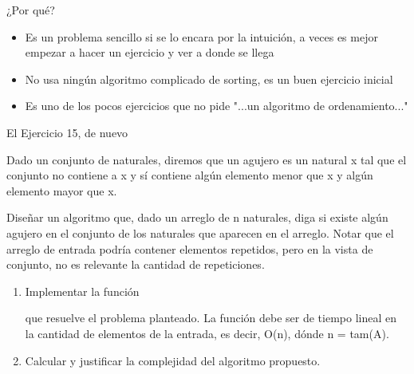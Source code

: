 \documentclass[pdf
]{beamer}
\begin{document}
\begin{frame}{¿Por qué?}

\begin{itemize}
\item Es un problema sencillo si se lo encara por la intuición\pause, a veces es mejor empezar a hacer un ejercicio y ver a donde se llega

\pause

\item No usa ningún algoritmo complicado de sorting, es un buen ejercicio inicial

\pause

\item Es uno de los pocos ejercicios que no pide "...un algoritmo de ordenamiento..."
\end{itemize}

\end{frame}

\begin{frame}{El Ejercicio 15, de nuevo}

Dado un conjunto de naturales, diremos que un agujero es un natural x tal que el conjunto no contiene a x y sí contiene algún elemento menor que x y algún elemento mayor que x.

\vspace{10pt}


Diseñar un algoritmo que, dado un arreglo de n naturales, diga si existe algún agujero en el conjunto de los naturales que aparecen en el arreglo. Notar que el arreglo de entrada podría contener elementos repetidos, pero en la vista de conjunto, no es relevante la cantidad de repeticiones.

\vspace{10pt}


\begin{enumerate}
\item {Implementar la función 

que resuelve el problema planteado. La función debe ser de tiempo lineal en la cantidad de elementos de la entrada, es decir, O(n), dónde n = tam(A).}

\item {Calcular y justificar la complejidad del algoritmo propuesto.}
\end{enumerate}



\end{frame}
\end{document}
